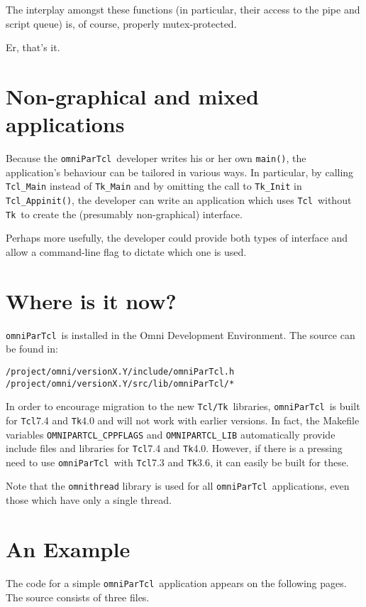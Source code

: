 \documentclass[11pt]{article}
\def\omniParTcl{{\tt omniParTcl}}
\def\tcltk{{\tt Tcl/Tk}}
\def\tcl{{\tt Tcl}}
\def\tk{{\tt Tk}}
\begin{document}
\noindent
The interplay amongst these functions (in particular, their access
to the pipe and script queue) is, of course, properly mutex-protected.

Er, that's it.

\section{Non-graphical and mixed applications}

Because the \omniParTcl\ developer writes his or her own {\tt main()},
the application's behaviour can be tailored in various ways.  In
particular, by calling {\tt Tcl\_Main} instead of {\tt Tk\_Main}
and by omitting the call to {\tt Tk\_Init} in 
{\tt Tcl\_Appinit()}, the developer can write an application which
uses \tcl\ without \tk\ to create the (presumably non-graphical) interface.

Perhaps more usefully, the developer could provide both types of interface
and allow a command-line flag to dictate which one is used.  

\section{Where is it now?}

\omniParTcl\ is installed in the Omni Development Environment.
The source can be found in:

\begin{verbatim}
/project/omni/versionX.Y/include/omniParTcl.h
/project/omni/versionX.Y/src/lib/omniParTcl/*
\end{verbatim}

In order to encourage migration to the new \tcltk\ libraries,
\omniParTcl\ is built for \tcl 7.4 and \tk 4.0 and will not
work with earlier versions.  In fact, the Makefile variables 
\verb|OMNIPARTCL_CPPFLAGS| and \verb|OMNIPARTCL_LIB| automatically provide
include files and libraries for \tcl 7.4 and \tk 4.0.  However, if there is a
pressing need to use \omniParTcl\ with \tcl 7.3 and \tk 3.6, it can
easily be built for these.

Note that the {\tt omnithread} library is used for all \omniParTcl\ 
applications, even those which have only a single thread.

\section{An Example}

The code for a simple \omniParTcl\ application appears on the following
pages.  The source consists of three files.
\end{document}
